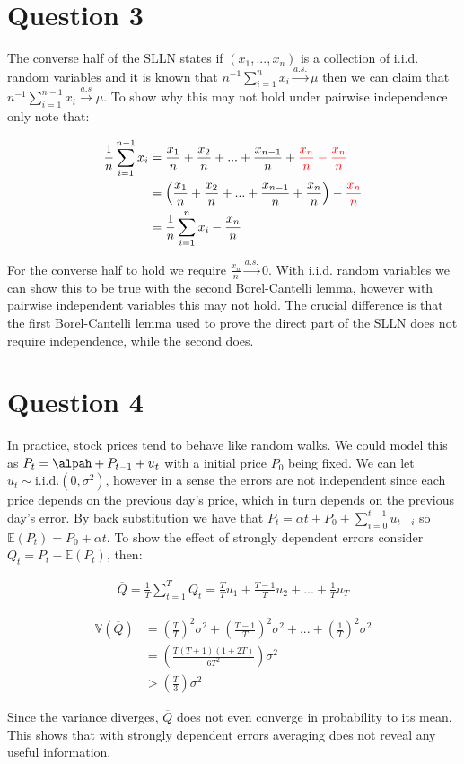 \documentclass[11pt]{article}\usepackage[utf8]{inputenc}
\begin{document}
\section*{Question 3}

The converse half of the SLLN states if $\left ( x_1, ..., x_n \right )$ is a collection of i.i.d. random variables and it is known that $n^{-1}\sum_{i=1}^nx_i \xrightarrow{a.s.} \mu$ then we can claim that $n^{-1}\sum_{i=1}^{n-1}x_i \xrightarrow{a.s} \mu$. To show why this may not hold under pairwise independence only note that: 

\begin{align*}
    \frac{1}{n}\sum_{i=1}^{n-1}x_i &= \frac{x_1}{n} + \frac{x_2}{n} + ... + \frac{x_{n-1}}{n} + {\color{red} \frac{x_n}{n} - \frac{x_n}{n}} \\
    & = \left ( \frac{x_1}{n} + \frac{x_2}{n} + ... + \frac{x_{n-1}}{n} + \frac{x_n}{n} \right ) - {\color{red} \frac{x_n}{n}} \\ 
    & = \frac{1}{n}\sum_{i=1}^{n}x_i - \frac{x_n}{n} 
\end{align*}

For the converse half to hold we require $\frac{x_n}{n} \xrightarrow{a.s.} 0$. With i.i.d. random variables we can show this to be true with the second Borel-Cantelli lemma, however with pairwise independent variables this may not hold. The crucial difference is that the first Borel-Cantelli lemma used to prove the direct part of the SLLN does not require independence, while the second does. 

\section*{Question 4}

In practice, stock prices tend to behave like random walks. We could model this as $P_t = \alpah + P_{t-1} + u_t$ with a initial price $P_0$ being fixed. We can let $u_t \sim \text{i.i.d.}(0,\sigma^2)$, however in a sense the errors are not independent since each price depends on the previous day's price, which in turn depends on the previous day's error. By back substitution we have that $P_t = \alpha t + P_0 + \sum_{i=0}^{t-1} u_{t-i}$ so $\mathbb{E}(P_t) = P_0 + \alpha t $. To show the effect of strongly dependent errors consider $Q_t = P_t - \mathbb{E}(P_t)$, then: 

\begin{align*}
    \overline{Q} = \frac{1}{T} \sum_{t=1}^{T}Q_t = \frac{T}{T}u_1 + \frac{T-1}{T}u_2 + ... + \frac{1}{T}u_T
\end{align*}

\begin{align*}
    \mathbb{V}(\overline{Q}) &= \left ( \frac{T}{T} \right )^2\sigma^2 + \left ( \frac{T-1}{T} \right )^2\sigma^2 + ... + \left ( \frac{1}{T} \right )^2\sigma^2  \\
    & = \left ( \frac{T(T+1)(1+2T)}{6T^2} \right )\sigma^2 \\
    & > \left ( \frac{T}{3} \right ) \sigma^2
\end{align*}

Since the variance diverges, $\overline{Q}$ does not even converge in probability to its mean. This shows that with strongly dependent errors averaging does not reveal any useful information. 
\end{document}
